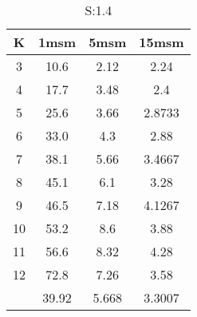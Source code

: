 \begin{table}[H]
\centering
\begin{tabular}{c|ccc}
K &1msm &5msm &15msm\\
\hline
3 & 10.6 & 2.12 & 2.24\\
4 & 17.7 & 3.48 & 2.4\\
5 & 25.6 & 3.66 & 2.8733\\
6 & 33.0 & 4.3 & 2.88\\
7 & 38.1 & 5.66 & 3.4667\\
8 & 45.1 & 6.1 & 3.28\\
9 & 46.5 & 7.18 & 4.1267\\
10 & 53.2 & 8.6 & 3.88\\
11 & 56.6 & 8.32 & 4.28\\
12 & 72.8 & 7.26 & 3.58\\
\hline
& 39.92 & 5.668 & 3.3007\\
\end{tabular}
\caption{S:1.4}
\label{tab:s1.4}
\end{table}

